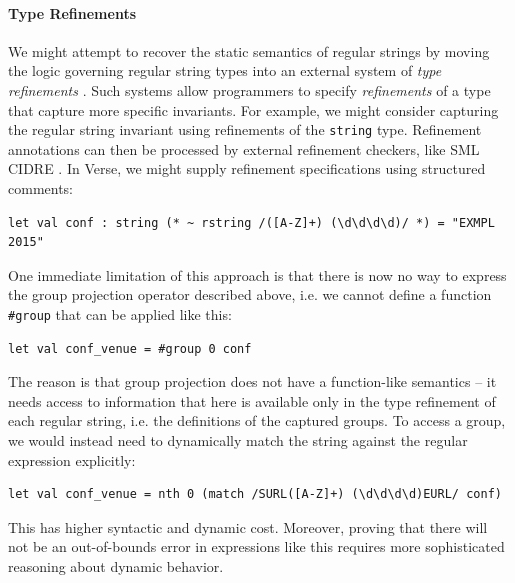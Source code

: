 \paragraph{Type Refinements}
We might attempt to recover the static semantics of regular strings by moving the logic governing regular string types into an external system of \emph{type refinements} \cite{Freeman91}. %
Such  systems allow programmers to specify \emph{refinements} of a type that capture more specific invariants. For example, we might consider capturing the regular string invariant using refinements of the \lstinline{string} type. Refinement annotations can then be processed by external refinement checkers, like SML CIDRE \cite{davies1997refinement}. In Verse, we might supply refinement specifications using structured comments:
\begin{lstlisting}[numbers=none]
let val conf : string (* ~ rstring /([A-Z]+) (\d\d\d\d)/ *) = "EXMPL 2015"
\end{lstlisting}
One immediate limitation of this approach is that there is now no way to express the group projection operator described above, i.e. we cannot define a function \lstinline{#group} that can be applied like this:
\begin{lstlisting}[numbers=none]
let val conf_venue = #group 0 conf
\end{lstlisting}
The reason is that group projection does not have a function-like semantics -- it needs access to information that here is  available only in the type refinement of each regular string, i.e. the definitions of the captured groups. To access a group, we would instead need to dynamically match the string against the regular expression explicitly:

\begin{lstlisting}[numbers=none]
let val conf_venue = nth 0 (match /SURL([A-Z]+) (\d\d\d\d)EURL/ conf)
\end{lstlisting}
This has higher syntactic and dynamic cost. Moreover, proving that there will not be an out-of-bounds error in expressions like this requires more sophisticated reasoning about dynamic behavior.

